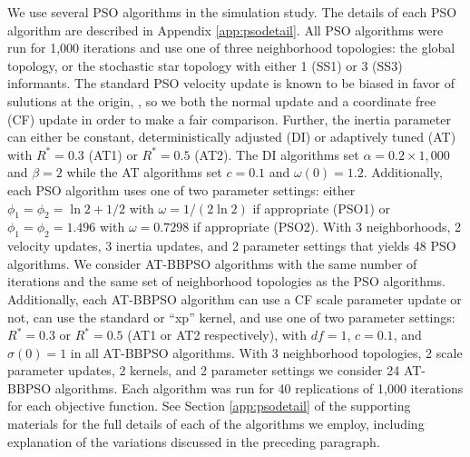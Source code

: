 \documentclass[cmbright]{staauth}
\begin{document}
We use several PSO algorithms in the simulation study. The details of each PSO algorithm are described in Appendix \ref{app:psodetail}. All PSO algorithms were run for 1,000 iterations and use one of three neighborhood topologies: the global topology, or the stochastic star topology with either 1 (SS1) or 3 (SS3) informants. The standard PSO velocity update is known to be biased in favor of sulutions at the origin, \cite{monson2005exposing,spears2010biases}, so we both the normal update and a coordinate free (CF) update in order to make a fair comparison. Further, the inertia parameter can either be constant, deterministically adjusted (DI) or adaptively tuned (AT) with $R^*=0.3$ (AT1) or $R^*=0.5$ (AT2). The DI algorithms set $\alpha=0.2\times 1,000$ and $\beta=2$ while the AT algorithms set $c=0.1$ and $\omega(0)=1.2$. Additionally, each PSO algorithm uses one of two parameter settings: either $\phi_1=\phi_2=\ln2 + 1/2$ with $\omega=1/(2\ln2)$ if appropriate (PSO1) or $\phi_1=\phi_2=1.496$ with $\omega=0.7298$ if appropriate (PSO2). With 3 neighborhoods, 2 velocity updates, 3 inertia updates, and 2 parameter settings that yields 48 PSO algorithms. We consider AT-BBPSO algorithms with the same number of iterations and the same set of neighborhood topologies as the PSO algorithms. Additionally, each AT-BBPSO algorithm can use a CF scale parameter update or not, can use the standard or ``xp'' kernel, and use one of two parameter settings: $R^*=0.3$ or $R^*=0.5$ (AT1 or AT2 respectively), with $df=1$, $c=0.1$, and $\sigma(0)=1$ in all AT-BBPSO algorithms. With 3 neighborhood topologies, 2 scale parameter updates, 2 kernels, and 2 parameter settings we consider 24 AT-BBPSO algorithms. Each algorithm was run for 40 replications of 1,000 iterations for each objective function. See Section \ref{app:psodetail} of the supporting materials for the full details of each of the algorithms we employ, including explanation of the variations discussed in the preceding paragraph.
\end{document}
